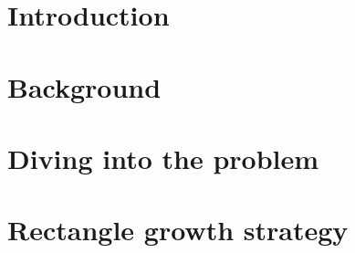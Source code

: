 \documentclass{report}
\begin{document}
\chapter{Introduction}


\chapter{Background}


\chapter{Diving into the problem}


\chapter{Rectangle growth strategy}

\end{document}
